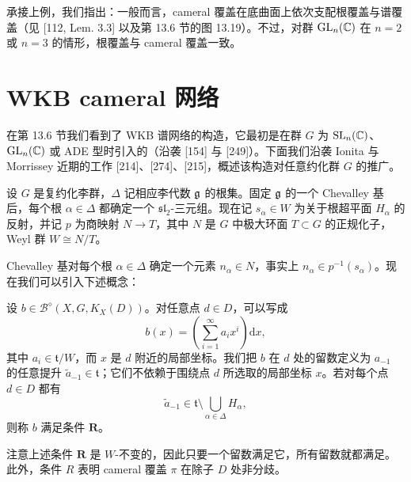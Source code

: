 \begin{remark}[25.5] 承接上例，我们指出：一般而言，cameral 覆盖在底曲面上依次支配根覆盖与谱覆盖（见 [112, Lem. 3.3] 以及第 13.6 节的图 13.19）。不过，对群 $\operatorname{GL}_n(\mathbb{C})$ 在 $n=2$ 或 $n=3$ 的情形，根覆盖与 cameral 覆盖一致。\end{remark}


\section{WKB cameral 网络}

在第 13.6 节我们看到了 WKB 谱网络的构造，它最初是在群 $G$ 为 $\operatorname{SL}_n(\mathbb{C})$、$\operatorname{GL}_n(\mathbb{C})$ 或 ADE 型时引入的（沿袭 [154] 与 [249]）。下面我们沿袭 Ionita 与 Morrissey 近期的工作 [214]、[274]、[215]，概述该构造对任意约化群 $G$ 的推广。

设 $G$ 是复约化李群，$\Delta$ 记相应李代数 $\mathfrak{g}$ 的根集。固定 $\mathfrak{g}$ 的一个 Chevalley 基后，每个根 $\alpha\in\Delta$ 都确定一个 $\mathfrak{sl}_2$-三元组。现在记 $s_\alpha\in W$ 为关于根超平面 $H_\alpha$ 的反射，并记 $p$ 为商映射 $N\to T$，其中 $N$ 是 $G$ 中极大环面 $T\subset G$ 的正规化子，Weyl 群 $W\cong N/T$。

Chevalley 基对每个根 $\alpha\in\Delta$ 确定一个元素 $n_\alpha\in N$，事实上 $n_\alpha\in p^{-1}(s_\alpha)$。现在我们可以引入下述概念：

\begin{definition}[25.6] 设 $b\in\mathcal{B}^{\diamond}(X,G,K_X(D))$。对任意点 $d\in D$，可以写成
\[
b(x)=\left(\sum_{i=1}^{\infty}a_ix^i\right)\mathrm{d}x,
\]
其中 $a_i\in\mathfrak{t}/W$，而 $x$ 是 $d$ 附近的局部坐标。我们把 $b$ 在 $d$ 处的留数定义为 $a_{-1}$ 的任意提升 $\tilde a_{-1}\in\mathfrak{t}$；它们不依赖于围绕点 $d$ 所选取的局部坐标 $x$。若对每个点 $d\in D$ 都有
\[
\tilde a_{-1}\in\mathfrak{t}\setminus\bigcup_{\alpha\in\Delta}H_\alpha,
\]
则称 $b$ 满足条件 $\mathbf{R}$。\end{definition}

注意上述条件 $\mathbf{R}$ 是 $W$-不变的，因此只要一个留数满足它，所有留数就都满足。此外，条件 $R$ 表明 cameral 覆盖 $\pi$ 在除子 $D$ 处非分歧。

